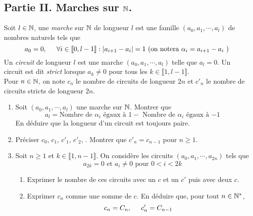 \subsection*{Partie II. Marches sur $\mathbb{N}$.}
Soit $l\in \mathbb{N}$, une \emph{marche} sur $\mathbb{N}$ de longueur $l$ est une famille $(a_0,a_1,\cdots,a_l)$ de nombres naturels tels que
\begin{displaymath}
  a_0 = 0,\hspace{0.5cm}\forall i\in \llbracket 0, l-1 \rrbracket: |a_{i+1}-a_i|=1
  \text{ (on notera $\alpha_i = a_{i+1}-a_i$ )}
\end{displaymath}
Un \emph{circuit} de longueur $l$ est une marche $(a_0,a_1,\cdots,a_l)$ telle que $a_l=0$. Un circuit est dit \emph{strict} lorsque $a_k\neq 0$ pour tous les $k\in \llbracket 1,l-1\rrbracket$.\\
Pour $n\in \mathbb{N}$, on note $c_n$ le nombre de circuits de longueur $2n$ et $c'_n$ le nombre de circuits stricts de longueur $2n$.
\begin{enumerate}
  \item Soit $(a_0,a_1,\cdots,a_l)$ une marche sur $\mathbb{N}$. Montrer que 
\begin{displaymath}
  a_l = \text{Nombre de $\alpha_i$ égaux à $1$} 
  - \text{ Nombre de $\alpha_i$ égaux à $-1$}
\end{displaymath}
En déduire que la longueur d'un circuit est toujours paire.

\item Préciser $c_0$, $c_1$, $c'_1$, $c'_2$, . Montrer que $c'_n = c_{n-1}$ pour $n\geq 1$.

\item Soit $n\geq 1$ et $k\in \llbracket 1, n-1\rrbracket$. On considère les circuits $(a_0,a_1,\cdots,a_{2n})$ tels que
\begin{displaymath}
a_{2k}=0 \text{ et } a_i\neq 0 \text{ pour } 0< i < 2k  
\end{displaymath}
\begin{enumerate}
  \item Exprimer le nombre de ces circuits avec un $c$ et un $c'$ puis avec deux $c$.
  \item Exprimer $c_n$ comme une somme de $c$. En déduire que, pour tout $n\in \mathbb{N}^*$,
\begin{displaymath}
  c_n = C_n, \hspace{0.5cm} c'_n = C_{n-1}
\end{displaymath}
\end{enumerate}

\end{enumerate}


